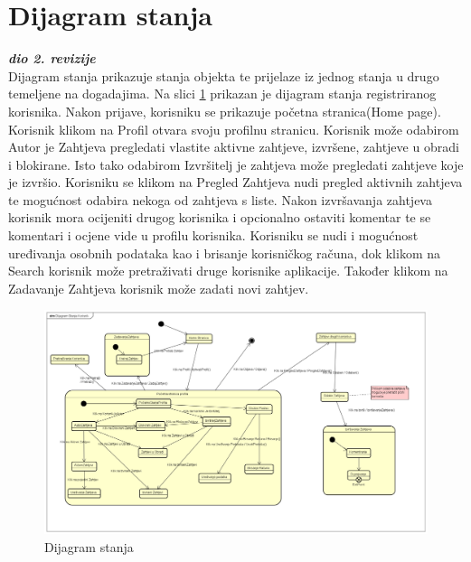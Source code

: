 			

\newpage			
\section{Dijagram stanja}
			
			\textbf{\textit{dio 2. revizije}}\\		
		
		\text Dijagram stanja prikazuje stanja objekta te prijelaze iz jednog stanja u drugo temeljene na dogadajima. Na slici
		\ref{fig:4.10} prikazan je dijagram stanja registriranog korisnika. Nakon prijave, korisniku se prikazuje početna stranica(Home page). Korisnik klikom na Profil otvara svoju profilnu stranicu. Korisnik može odabirom Autor je Zahtjeva pregledati vlastite aktivne zahtjeve, izvršene, zahtjeve u obradi i blokirane. Isto tako odabirom Izvršitelj je zahtjeva može pregledati zahtjeve koje je izvršio. Korisniku se klikom na Pregled Zahtjeva nudi pregled aktivnih zahtjeva te mogućnost odabira nekoga od zahtjeva s liste. Nakon izvršavanja zahtjeva korisnik mora ocijeniti drugog korisnika i opcionalno ostaviti komentar te se komentari i ocjene vide u profilu korisnika. Korisniku se nudi i mogućnost uređivanja osobnih podataka kao i brisanje korisničkog računa, dok klikom  na Search korisnik može pretraživati druge korisnike aplikacije. Također klikom na Zadavanje Zahtjeva korisnik može zadati novi zahtjev.
		
		\begin{figure}[H]
			\includegraphics[scale=0.3]{slike/Dijagram Stanja Korisnik.png} %
			\centering
			\caption { Dijagram stanja}
			\label{fig:4.10}
			\end{figure}		
			
